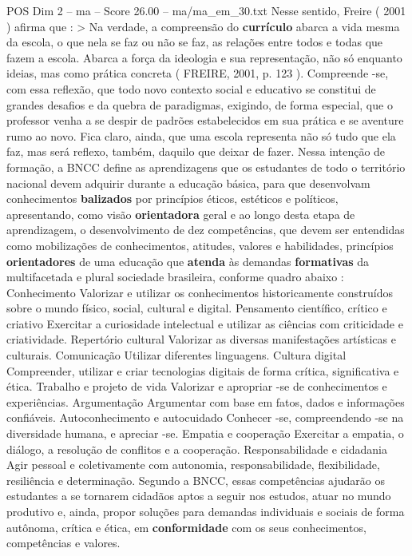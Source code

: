 \begin{textsample}{POS Dim 2 – ma – Score 26.00 – ma/ma\_em\_30.txt}
Nesse sentido, Freire ( 2001 ) afirma que : > Na verdade, a compreensão do \textbf{currículo} abarca a vida mesma da escola, o que nela se faz ou não se faz, as relações entre todos e todas que fazem a escola.
Abarca a força da ideologia e sua representação, não só enquanto ideias, mas como prática concreta ( FREIRE, 2001, p. 123 ).
Compreende -se, com essa reflexão, que todo novo contexto social e educativo se constitui de grandes desafios e da quebra de paradigmas, exigindo, de forma especial, que o professor venha a se despir de padrões estabelecidos em sua prática e se aventure rumo ao novo.
Fica claro, ainda, que uma escola representa não só tudo que ela faz, mas será reflexo, também, daquilo que deixar de fazer.
Nessa intenção de formação, a BNCC define as aprendizagens que os estudantes de todo o território nacional devem adquirir durante a educação básica, para que desenvolvam conhecimentos \textbf{balizados} por princípios éticos, estéticos e políticos, apresentando, como visão \textbf{orientadora} geral e ao longo desta etapa de aprendizagem, o desenvolvimento de dez competências, que devem ser entendidas como mobilizações de conhecimentos, atitudes, valores e habilidades, princípios \textbf{orientadores} de uma educação que \textbf{atenda} às demandas \textbf{formativas} da multifacetada e plural sociedade brasileira, conforme quadro abaixo : Conhecimento Valorizar e utilizar os conhecimentos historicamente construídos sobre o mundo físico, social, cultural e digital.
Pensamento científico, crítico e criativo Exercitar a curiosidade intelectual e utilizar as ciências com criticidade e criatividade.
Repertório cultural Valorizar as diversas manifestações artísticas e culturais.
Comunicação Utilizar diferentes linguagens.
Cultura digital Compreender, utilizar e criar tecnologias digitais de forma crítica, significativa e ética.
Trabalho e projeto de vida Valorizar e apropriar -se de conhecimentos e experiências.
Argumentação Argumentar com base em fatos, dados e informações confiáveis.
Autoconhecimento e autocuidado Conhecer -se, compreendendo -se na diversidade humana, e apreciar -se.
Empatia e cooperação Exercitar a empatia, o diálogo, a resolução de conflitos e a cooperação.
Responsabilidade e cidadania Agir pessoal e coletivamente com autonomia, responsabilidade, flexibilidade, resiliência e determinação.
Segundo a BNCC, essas competências ajudarão os estudantes a se tornarem cidadãos aptos a seguir nos estudos, atuar no mundo produtivo e, ainda, propor soluções para demandas individuais e sociais de forma autônoma, crítica e ética, em \textbf{conformidade} com os seus conhecimentos, competências e valores.

\end{textsample}
